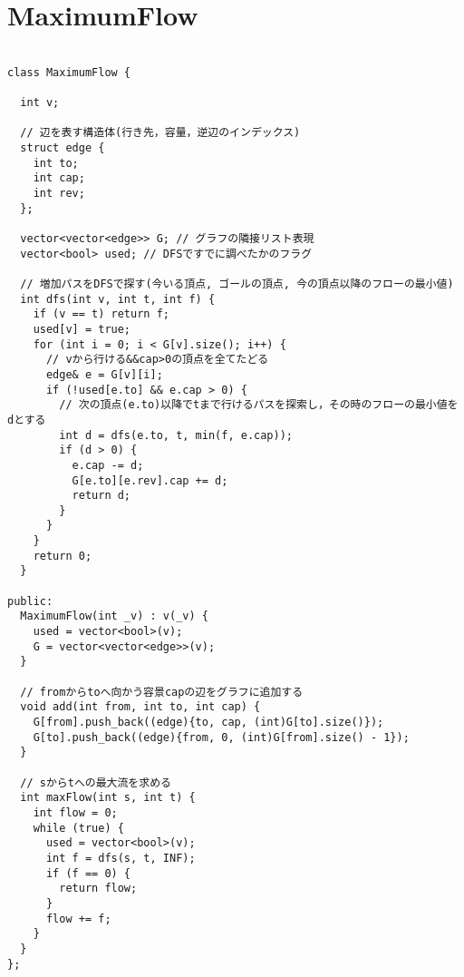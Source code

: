 \documentclass[a4j,titlepage]{jarticle} %
\begin{document}
\section{MaximumFlow}
\color{black}
\begin{lstlisting}[caption=MaximumFlow]

class MaximumFlow {

  int v;

  // 辺を表す構造体(行き先，容量，逆辺のインデックス)
  struct edge {
    int to;
    int cap;
    int rev;
  };

  vector<vector<edge>> G; // グラフの隣接リスト表現
  vector<bool> used; // DFSですでに調べたかのフラグ

  // 増加パスをDFSで探す(今いる頂点, ゴールの頂点, 今の頂点以降のフローの最小値)
  int dfs(int v, int t, int f) {
    if (v == t) return f;
    used[v] = true;
    for (int i = 0; i < G[v].size(); i++) {
      // vから行ける&&cap>0の頂点を全てたどる
      edge& e = G[v][i];
      if (!used[e.to] && e.cap > 0) {
        // 次の頂点(e.to)以降でtまで行けるパスを探索し，その時のフローの最小値をdとする
        int d = dfs(e.to, t, min(f, e.cap));
        if (d > 0) {
          e.cap -= d;
          G[e.to][e.rev].cap += d;
          return d;
        }
      }
    }
    return 0;
  }

public:
  MaximumFlow(int _v) : v(_v) {
    used = vector<bool>(v);
    G = vector<vector<edge>>(v);
  }

  // fromからtoへ向かう容景capの辺をグラフに追加する
  void add(int from, int to, int cap) {
    G[from].push_back((edge){to, cap, (int)G[to].size()});
    G[to].push_back((edge){from, 0, (int)G[from].size() - 1});
  }

  // sからtへの最大流を求める
  int maxFlow(int s, int t) {
    int flow = 0;
    while (true) {
      used = vector<bool>(v);
      int f = dfs(s, t, INF);
      if (f == 0) {
        return flow;
      }
      flow += f;
    }
  }
};

\end{lstlisting}

\color{white}
\end{document}
